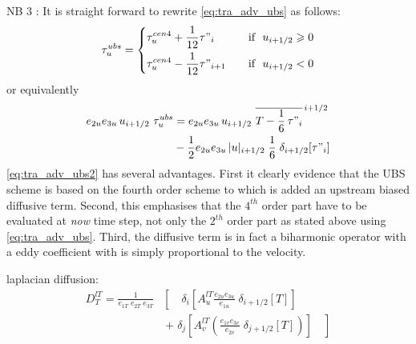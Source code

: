 \documentclass[../tex_main/NEMO_manual]{subfiles}
\begin{document}
NB 3 : It is straight forward to rewrite \autoref{eq:tra_adv_ubs} as follows:
\begin{equation} \label{eq:tra_adv_ubs2}
\tau _u^{ubs} = \left\{	 \begin{aligned}
	& \tau _u^{cen4} + \frac{1}{12} \tau"_i		& \quad \text{if }\ u_{i+1/2} \geqslant 0 \\
	& \tau _u^{cen4} - \frac{1}{12} \tau"_{i+1}	& \quad \text{if }\ u_{i+1/2}       <       0
  						 \end{aligned}    \right.
\end{equation}
or equivalently 
\begin{equation} \label{eq:tra_adv_ubs2}
\begin{split}
e_{2u} e_{3u}\,u_{i+1/2} \ \tau _u^{ubs} 
&= e_{2u} e_{3u}\,u_{i+1/2} \ \overline{ T - \frac{1}{6}\,\tau"_i }^{\,i+1/2} \\
& - \frac{1}{2} e_{2u} e_{3u}\,|u|_{i+1/2} \;\frac{1}{6} \;\delta_{i+1/2}[\tau"_i]
\end{split}
\end{equation}
\autoref{eq:tra_adv_ubs2} has several advantages. First it clearly evidence that 
the UBS scheme is based on the fourth order scheme to which is added an 
upstream biased diffusive term. Second, this emphasises that the $4^{th}$ order 
part have to be evaluated at \emph{now} time step, not only the $2^{th}$ order 
part as stated above using \autoref{eq:tra_adv_ubs}. Third, the diffusive term is 
in fact a biharmonic operator with a eddy coefficient with is simply proportional 
to the velocity.

laplacian diffusion:
\begin{equation} \label{eq:tra_ldf_lap}
\begin{split}
D_T^{lT} =\frac{1}{e_{1T} \; e_{2T}\;  e_{3T} } &\left[ {\quad \delta _i 
\left[ {A_u^{lT} \frac{e_{2u} e_{3u} }{e_{1u} }\;\delta _{i+1/2} 
\left[ T \right]} \right]} \right.
\\
&\ \left. {+\; \delta _j \left[ 
{A_v^{lT} \left( {\frac{e_{1v} e_{3v} }{e_{2v} }\;\delta _{j+1/2} \left[ T 
\right]} \right)} \right]\quad } \right]
\end{split}
\end{equation}
\end{document}
